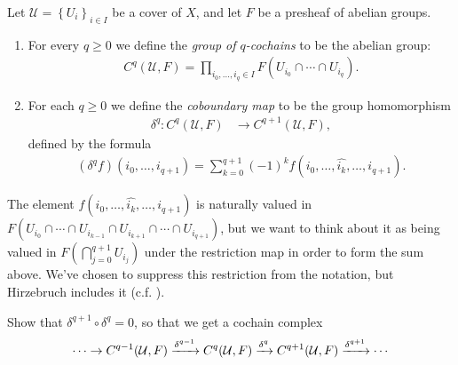 \documentclass[11pt]{book}
\begin{document}
\begin{definition}\label{def:cech-cochains-differential} Let $\mathcal{U} = \left\{ U_i \right\}_{i\in I}$ be a cover of $X$, and let $F$ be a presheaf of abelian groups.
\begin{enumerate}
    \item For every $q\ge0$ we define the \emph{group of $q$-cochains} to be the abelian group:
\begin{equation}\label{eqn:group-of-Cech-cochains}
\begin{aligned}
    C^q(\mathcal{U},F) = \prod_{i_0, \ldots, i_q \in I} F(U_{i_0} \cap \cdots \cap U_{i_q}).
\end{aligned}
\end{equation}
    \item For each $q\ge 0$ we define the \emph{coboundary map} to be the group homomorphism
\begin{equation}\label{eqn:cech-coboundary-formula}
\begin{aligned}
    \delta^q \colon C^q(\mathcal{U},F) &\to C^{q+1}(\mathcal{U},F),
\end{aligned}
\end{equation}
defined by the formula
\begin{align*}
    (\delta^q f)(i_0, \ldots, i_{q+1}) = \sum_{k=0}^{q+1} (-1)^k f(i_0, \ldots, \widehat{i_k}, \ldots, i_{q+1}).
\end{align*}
\end{enumerate}
\end{definition}

The element $f(i_0, \ldots, \widehat{i_k}, \ldots, i_{q+1})$ is naturally valued in $F(U_{i_0}\cap \cdots \cap U_{i_{k-1}} \cap U_{i_{k+1}}\cap \cdots \cap U_{i_{q+1}})$, but we want to think about it as being valued in $F(\bigcap_{j=0}^{q+1} U_{i_j})$ under the restriction map in order to form the sum above. We've chosen to suppress this restriction from the notation, but Hirzebruch includes it (c.f. \cite[p.~26]{Hirzebruch}).
%
\begin{exercise} Show that $\delta^{q+1}\circ \delta^q = 0$, so that we get a cochain complex
\begin{equation}\label{eqn:Cech-cochain-complex}
\begin{aligned}
     \cdots \to C^{q-1}(\mathcal{U},F) \xrightarrow{\delta^{q-1}} C^q(\mathcal{U},F) \xrightarrow{\delta^q} C^{q+1}(\mathcal{U},F) \xrightarrow{\delta^{q+1}} \cdots
\end{aligned}
\end{equation}
\end{exercise}
\end{document}
